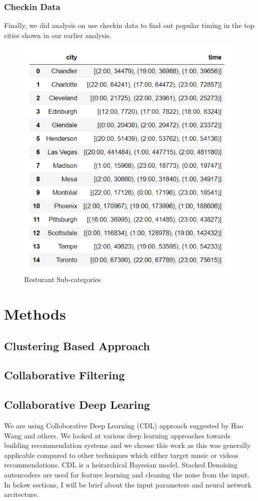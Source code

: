 \documentclass[11pt]{article}
\begin{document}
 	\subsubsection{Checkin Data}
 	Finally, we did analysis on use checkin data to find out popular timing in the top cities shown in our earlier analysis.
 
 	\begin{figure}[h]
 		\centering
 		\includegraphics[scale=0.5] {checkin_times.png}
 		\caption{Resturant Sub-categories}
 	\end{figure}
	\section{Methods}
		
		\subsection{Clustering Based Approach}
		
		\subsection{Collaborative Filtering}
		
		\subsection{Collaborative Deep Learing}
		We are using Colloborative Deep Learning \cite{cdl} (CDL) approach suggested by Hao Wang and others. We looked at various deep learning approaches towards building recommendation systems and we choose this work as this was generally applicable compared to other techniques which either target music or videos recommendations. CDL is a heirarchical Bayesian model. Stacked Denoising autencoders \cite{sdae} are used for feature learning and cleaning the noise from the input. In below sections, I will be brief about the input parameters and neural network arcitecture.
		
\end{document}
